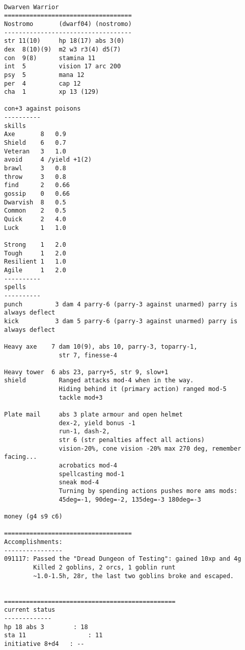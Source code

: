 \

\pagebreak[1]
\tiny \begin{samepage} \begin{verbatim}
Dwarven Warrior
===================================
Nostromo       (dwarf04) (nostromo)
-----------------------------------
str 11(10)     hp 18(17) abs 3(0)
dex  8(10)(9)  m2 w3 r3(4) d5(7)
con  9(8)      stamina 11
int  5         vision 17 arc 200
psy  5         mana 12
per  4         cap 12
cha  1         xp 13 (129)

con+3 against poisons
----------
skills
Axe       8   0.9
Shield    6   0.7
Veteran   3   1.0
avoid     4 /yield +1(2)
brawl     3   0.8
throw     3   0.8
find      2   0.66
gossip    0   0.66
Dwarvish  8   0.5
Common    2   0.5
Quick     2   4.0
Luck      1   1.0

Strong    1   2.0
Tough     1   2.0
Resilient 1   1.0
Agile     1   2.0
----------
spells
----------
punch         3 dam 4 parry-6 (parry-3 against unarmed) parry is always deflect
kick          3 dam 5 parry-6 (parry-3 against unarmed) parry is always deflect

Heavy axe    7 dam 10(9), abs 10, parry-3, toparry-1,
               str 7, finesse-4

Heavy tower  6 abs 23, parry+5, str 9, slow+1
shield         Ranged attacks mod-4 when in the way.
               Hiding behind it (primary action) ranged mod-5
               tackle mod+3

Plate mail     abs 3 plate armour and open helmet
               dex-2, yield bonus -1
               run-1, dash-2,
               str 6 (str penalties affect all actions)
               vision-20%, cone vision -20% max 270 deg, remember facing...
               acrobatics mod-4
               spellcasting mod-1
               sneak mod-4
               Turning by spending actions pushes more ams mods:
               45deg=-1, 90deg=-2, 135deg=-3 180deg=-3

money (g4 s9 c6)

===================================
Accomplishments:
----------------
091117: Passed the "Dread Dungeon of Testing": gained 10xp and 4g
        Killed 2 goblins, 2 orcs, 1 goblin runt
        ~1.0-1.5h, 28r, the last two goblins broke and escaped.


===============================================
current status
-------------
hp 18 abs 3        : 18
sta 11                 : 11
initiative 8+d4   : --
\end{verbatim} \end{samepage} \normalsize


